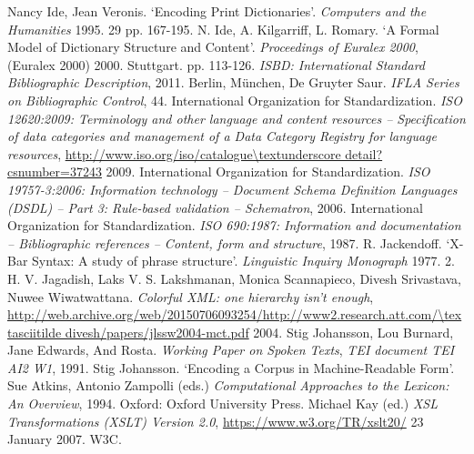 \begin{bibitemlist}{1}
\label{DI-BIBL-4}Nancy Ide, Jean Veronis. ‘Encoding Print Dictionaries’. \textit{Computers and the Humanities} 1995. 29 pp. 167-195. 
\label{DI-BIBL-9}N. Ide, A. Kilgarriff, L. Romary. ‘A Formal Model of Dictionary Structure and Content’. \textit{Proceedings of Euralex 2000},  (Euralex 2000) 2000. Stuttgart. pp. 113-126. 
\label{ISBD}\textit{ISBD: International Standard Bibliographic Description}, 2011. Berlin, München, De Gruyter Saur. \textit{IFLA Series on Bibliographic Control},  44. 
\label{ISO-12620}International Organization for Standardization. \textit{ISO 12620:2009: Terminology and other language and content resources – Specification of data categories and management of a Data Category Registry for language resources},  \url{http://www.iso.org/iso/catalogue\textunderscore detail?csnumber=37243} 2009. 
\label{ISO-19757-3}International Organization for Standardization. \textit{ISO 19757-3:2006: Information technology – Document Schema Definition Languages (DSDL) – Part 3: Rule-based validation – Schematron}, 2006. 
\label{ISO-690}International Organization for Standardization. \textit{ISO 690:1987: Information and documentation – Bibliographic references – Content, form and structure}, 1987. 
\label{GD-BIBL-2}R. Jackendoff. ‘X-Bar Syntax: A study of phrase structure’. \textit{Linguistic Inquiry Monograph} 1977. 2. 
\label{NH-BIBL-4}H. V. Jagadish, Laks V. S. Lakshmanan, Monica Scannapieco, Divesh Srivastava, Nuwee Wiwatwattana. \textit{Colorful XML: one hierarchy isn't enough},  \url{http://web.archive.org/web/20150706093254/http://www2.research.att.com/\textasciitilde divesh/papers/jlssw2004-mct.pdf} 2004. 
\label{TS-BIBL-3}Stig Johansson, Lou Burnard, Jane Edwards, And Rosta. \textit{Working Paper on Spoken Texts}, \textit{TEI document TEI AI2 W1}, 1991. 
\label{TS-BIBL-2}Stig Johansson. ‘Encoding a Corpus in Machine-Readable Form’. Sue Atkins, Antonio Zampolli (eds.) \textit{Computational Approaches to the Lexicon: An Overview}, 1994. Oxford: Oxford University Press. 
\label{XSLT2}Michael Kay (ed.) \textit{XSL Transformations (XSLT) Version 2.0},  \url{https://www.w3.org/TR/xslt20/} 23 January 2007. W3C. 

\end{bibitemlist}
